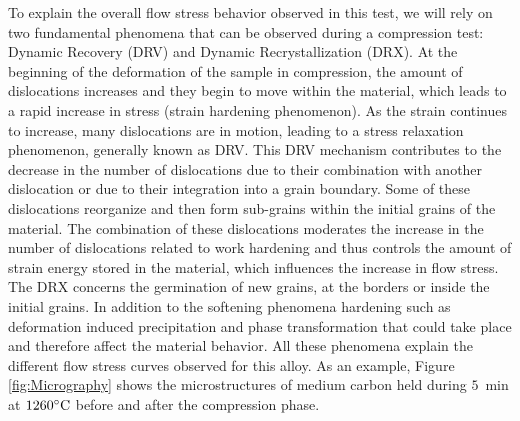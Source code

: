 \documentclass[twoside,english,1p,final,sort&compress]{elsarticle}
\theoremstyle{plain}
\begin{document}
To explain the overall flow stress behavior observed in this test, we will rely on two fundamental phenomena that can be observed during a compression test: Dynamic Recovery (DRV) and Dynamic Recrystallization (DRX).
At the beginning of the deformation of the sample in compression, the amount of dislocations increases and they begin to move within the material, which leads to a rapid increase in stress (strain hardening phenomenon).
As the strain continues to increase, many dislocations are in motion, leading to a stress relaxation phenomenon, generally known as DRV.
This DRV mechanism contributes to the decrease in the number of dislocations due to their combination with another dislocation or due to their integration into a grain boundary.
Some of these dislocations reorganize and then form sub-grains within the initial grains of the material.
The combination of these dislocations moderates the increase in the number of dislocations related to work hardening and thus controls the amount of strain energy stored in the material, which influences the increase in flow stress.
The DRX concerns the germination of new grains, at the borders or inside the initial grains. In addition to the softening phenomena hardening such as deformation induced precipitation and phase transformation that could take place and therefore affect the material behavior. All these phenomena explain the different flow stress curves observed for this alloy.
As an example, Figure \ref{fig:Micrography} shows the microstructures of medium carbon held during $5$~min at $1260\celsius$ before and after the compression phase.
\end{document}
